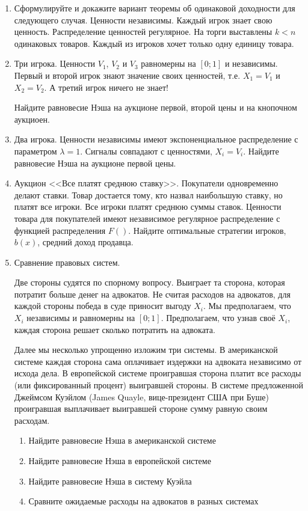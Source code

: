 \begin{enumerate}

\item Сформулируйте и докажите вариант теоремы об одинаковой доходности для следующего случая. Ценности независимы. Каждый игрок знает свою ценность. Распределение ценностей регулярное. На торги выставлены $ k<n $ одинаковых товаров. Каждый из игроков хочет только одну единицу товара.

\item Три игрока. Ценности $ V_{1} $, $ V_{2} $ и $ V_{3} $ равномерны на $ [0;1] $ и независимы. Первый и второй игрок знают значение своих ценностей, т.е. $ X_{1}=V_{1} $ и $ X_{2}=V_{2} $. А третий игрок ничего не знает! 

Найдите равновесие Нэша на аукционе первой, второй цены и на кнопочном аукциоен.


\item Два игрока. Ценности независимы имеют экспоненциальное распределение с параметром $ \lambda=1 $. Сигналы совпадают с ценностями,  $ X_{i}=V_{i} $. Найдите равновесие Нэша на аукционе первой цены.




\item Аукцион <<Все платят среднюю ставку>>. Покупатели одновременно делают ставки. Товар достается тому, кто назвал наибольшую ставку, но платят все игроки. Все игроки платят среднюю суммы ставок. Ценности товара для покупателей имеют независимое регулярное распределение с функцией распределения $ F() $. Найдите оптимальные стратегии игроков, $ b(x) $, средний доход продавца. 



\item Сравнение правовых систем.

Две стороны судятся по спорному вопросу. Выиграет та сторона, которая потратит больше денег на адвокатов. Не считая расходов на адвокатов, для каждой стороны победа в суде приносит выгоду $ X_{i} $. Мы предполагаем, что $ X_{i} $ независимы и равномерны на $ [0;1] $. Предполагаем, что узнав своё $ X_{i} $, каждая сторона решает сколько потратить на адвоката.

Далее мы несколько упрощенно изложим три системы. В американской системе каждая сторона сама оплачивает издержки на адвоката независимо от исхода дела. В европейской системе проигравшая сторона платит все расходы (или фиксированный процент) выигравшей стороны. В системе предложенной Джеймсом Куэйлом (James Quayle, вице-президент США при Буше) проигравшая выплачивает выигравшей стороне сумму равную своим расходам. 
\begin{enumerate}
\item Найдите равновесие Нэша в американской системе
\item Найдите равновесие Нэша в европейской системе
\item Найдите равновесие Нэша в систему Куэйла
\item Сравните ожидаемые расходы на адвокатов в разных системах
\end{enumerate}



\end{enumerate}
